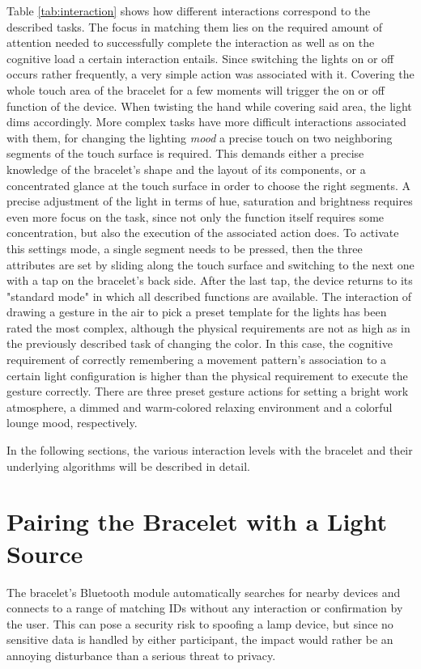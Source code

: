 Table \ref{tab:interaction} shows how different interactions correspond to the described tasks. The focus in matching them lies on the required amount of attention needed to successfully complete the interaction as well as on the cognitive load a certain interaction entails. Since switching the lights on or off occurs rather frequently, a very simple action was associated with it. Covering the whole touch area of the bracelet for a few moments will trigger the on or off function of the device. When twisting the hand while covering said area, the light dims accordingly. More complex tasks have more difficult interactions associated with them, for changing the lighting \textit{mood} a precise touch on two neighboring segments of the touch surface is required. This demands either a precise knowledge of the bracelet's shape and the layout of its components, or a concentrated glance at the touch surface in order to choose the right segments. A precise adjustment of the light in terms of hue, saturation and brightness requires even more focus on the task, since not only the function itself requires some concentration, but also the execution of the associated action does. To activate this settings mode, a single segment needs to be pressed, then the three attributes are set by sliding along the touch surface and switching to the next one with a tap on the bracelet's back side. After the last tap, the device returns to its "standard mode" in which all described functions are available. The interaction of drawing a gesture in the air to pick a preset template for the lights has been rated the most complex, although the physical requirements are not as high as in the previously described task of changing the color. In this case, the cognitive requirement of correctly remembering a movement pattern's association to a certain light configuration is higher than the physical requirement to execute the gesture correctly. There are three preset gesture actions for setting a bright work atmosphere, a dimmed and warm-colored relaxing environment and a colorful lounge mood, respectively.

In the following sections, the various interaction levels with the bracelet and their underlying algorithms will be described in detail.

\section{Pairing the Bracelet with a Light Source}
The bracelet's Bluetooth module automatically searches for nearby devices and connects to a range of matching IDs without any interaction or confirmation by the user. This can pose a security risk to spoofing a lamp device, but since no sensitive data is handled by either participant, the impact would rather be an annoying disturbance than a serious threat to privacy.

